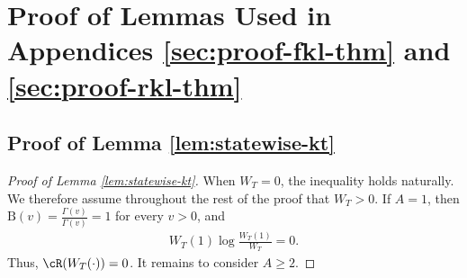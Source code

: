 \documentclass[11pt]{article}
\begin{document}
\section{Proof of Lemmas Used in Appendices \ref{sec:proof-fkl-thm} and \ref{sec:proof-rkl-thm}}
\label{sec:proof-fkl-lemma}
\subsection{Proof of Lemma \ref{lem:statewise-kt}}
\begin{proof}[Proof of Lemma \ref{lem:statewise-kt}]
When $W_T = 0$, the inequality holds naturally. We therefore assume throughout the rest of the proof that $W_T>0$. If $A=1$, then $\mathrm B(v)=\frac{\Gamma(v)}{\Gamma(v)}=1$ for every $v>0$, and
\begin{align*}
    W_T(1)\log\frac{W_T(1)}{W_T}=0.
\end{align*}
Thus, $\cR(W_T(\cdot))=0$. It remains to consider $A\geq2$.


\end{proof}
\end{document}
